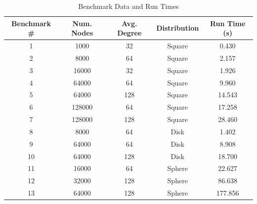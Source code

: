 \documentclass{article}
\begin{document}
        \begin{center}
            \begin{table}
                \centering
                \begin{tabular}{|c|c|c|c|c|}
                    \hline
                    Benchmark \# & Num. Nodes & Avg. Degree & Distribution & Run Time (s)\\
                    \hline
                    1 & 1000 & 32 & Square & 0.430 \\
                    2 & 8000 & 64 & Square & 2.157 \\
                    3 & 16000 & 32 & Square & 1.926 \\
                    4 & 64000 & 64 & Square & 9.960 \\
                    5 & 64000 & 128 & Square & 14.543 \\
                    6 & 128000 & 64 & Square & 17.258 \\
                    7 & 128000 & 128 & Square & 28.460 \\
                    8 & 8000 & 64 & Disk & 1.402 \\
                    9 & 64000 & 64 & Disk & 8.908 \\
                    10 & 64000 & 128 & Disk & 18.700 \\
                    11 & 16000 & 64 & Sphere & 22.627 \\
                    12 & 32000 & 128 & Sphere & 86.638 \\
                    13 & 64000 & 128 & Sphere & 177.856 \\
                    \hline
                \end{tabular}
                \caption{Benchmark Data and Run Times}
                \label{tab1}
            \end{table}
        \end{center}


\newpage
\end{document}
